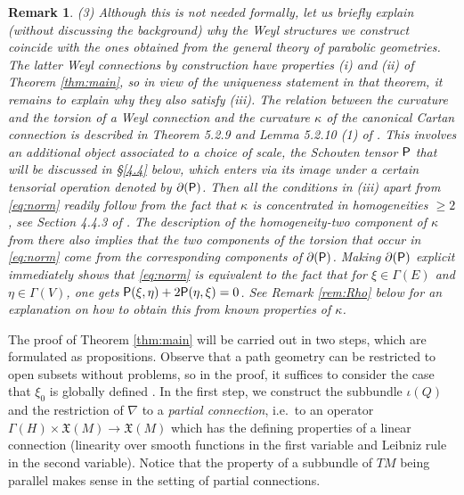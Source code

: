 \documentclass[11pt]{amsart}
\def\Rho{\mbox{\textsf{P}}}
\newtheorem{remark}[proposition]{Remark}
\numberwithin{proposition}{section}
\numberwithin{equation}{section}
\begin{document}
\begin{remark}
(3) Although this is not needed formally, let us briefly explain (without discussing the background) why the Weyl structures we construct coincide with the ones obtained from the general theory of parabolic geometries. The latter Weyl connections by construction have properties (i) and (ii) of Theorem \ref{thm:main}, so in view of the uniqueness statement in that theorem, it remains to explain why they also satisfy (iii). The relation between the curvature and the torsion of a Weyl connection and the curvature $\kappa$ of the canonical Cartan connection is described in Theorem 5.2.9 and Lemma 5.2.10 (1) of \cite{Book}. This involves an additional object associated to a choice of scale, the \textit{Schouten tensor} $\Rho$ that will be discussed in \S \ref{4.4} below, which enters via its image under a certain tensorial operation denoted by $\partial(\Rho)$. Then all the conditions in (iii) apart from \eqref{eq:norm} readily follow from the fact that $\kappa$ is concentrated in homogeneities $\geq 2$, see Section 4.4.3 of \cite{Book}. The description of the homogeneity-two component of $\kappa$ from there also implies that the two components of the torsion that occur in \eqref{eq:norm} come from the corresponding components of $\partial(\Rho)$. Making $\partial(\Rho)$ explicit immediately shows that \eqref{eq:norm} is equivalent to the fact that for $\xi\in\Gamma(E)$ and $\eta\in\Gamma(V)$, one gets $\Rho(\xi,\eta)+2\Rho(\eta,\xi)=0$. See Remark \ref{rem:Rho} below for an explanation on how to obtain this from known properties of $\kappa$. 
\end{remark}

The proof of Theorem \ref{thm:main} will be carried out in two steps, which are formulated as propositions.  Observe that a path geometry can be restricted to open subsets without problems, so in the proof, it suffices to consider the case that $\xi_0$ is globally defined . In the first step, we construct the subbundle $\iota(Q)$ and the restriction of $\nabla$ to a \textit{partial connection}, i.e.\ to an operator $\Gamma(H)\times\mathfrak X(M)\to\mathfrak X(M)$ which has the defining properties of a linear connection (linearity over smooth functions in the first variable and Leibniz rule in the second variable). Notice that the property of a subbundle of $TM$ being parallel makes sense in the setting of partial connections. 
\end{document}

